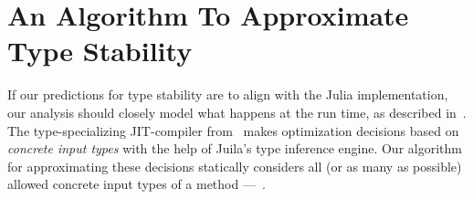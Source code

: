 \documentclass[sigplan,screen]{acmart}
\begin{document}
\section{An Algorithm To Approximate Type Stability}%
\label{sec:algo}

If our predictions for type stability are to align with the Julia
implementation, our analysis should closely model what happens at the run time,
as described in~\cite{Pelenitsyn21}. The type-specializing JIT-compiler
from~\cite{Pelenitsyn21} makes optimization decisions based on \emph{concrete
  input types} with the help of Juila's type inference engine. Our algorithm for
approximating these decisions statically considers all (or as many as
possible) allowed concrete input types of a method ---~.


\end{document}
